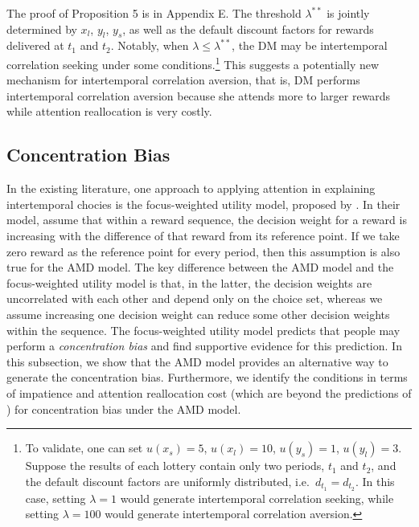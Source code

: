 \documentclass[
  12pt,
]{article}
\begin{document}
The proof of Proposition 5 is in Appendix E. The threshold
\(\lambda^{**}\) is jointly determined by \(x_l\), \(y_l\), \(y_s\), as
well as the default discount factors for rewards delivered at \(t_1\)
and \(t_2\). Notably, when \(\lambda \leq \lambda^{**}\), the DM may be
intertemporal correlation seeking under some conditions.\footnote{To
  validate, one can set \(u(x_s)=5\), \(u(x_l)=10\), \(u(y_s)=1\),
  \(u(y_l)=3\). Suppose the results of each lottery contain only two
  periods, \(t_1\) and \(t_2\), and the default discount factors are
  uniformly distributed, i.e.~\(d_{t_1}=d_{t_2}\). In this case, setting
  \(\lambda=1\) would generate intertemporal correlation seeking, while
  setting \(\lambda=100\) would generate intertemporal correlation
  aversion.} This suggests a potentially new mechanism for intertemporal
correlation aversion, that is, DM performs intertemporal correlation
aversion because she attends more to larger rewards while attention
reallocation is very costly.

\hypertarget{concentration-bias}{%
\subsection{Concentration Bias}\label{concentration-bias}}

In the existing literature, one approach to applying attention in
explaining intertemporal chocies is the focus-weighted utility model,
proposed by \citet{kHoszegi2013model}. In their model,
\citeauthor{kHoszegi2013model} assume that within a reward sequence, the
decision weight for a reward is increasing with the difference of that
reward from its reference point. If we take zero reward as the reference
point for every period, then this assumption is also true for the AMD
model. The key difference between the AMD model and the focus-weighted
utility model is that, in the latter, the decision weights are
uncorrelated with each other and depend only on the choice set, whereas
we assume increasing one decision weight can reduce some other decision
weights within the sequence. The focus-weighted utility model predicts
that people may perform a \emph{concentration bias} and
\citet{dertwinkel2022concentration} find supportive evidence for this
prediction. In this subsection, we show that the AMD model provides an
alternative way to generate the concentration bias. Furthermore, we
identify the conditions in terms of impatience and attention
reallocation cost (which are beyond the predictions of
\citet{kHoszegi2013model}) for concentration bias under the AMD model.
\end{document}
